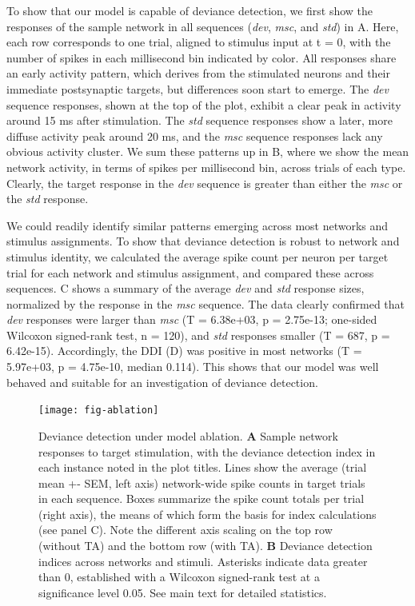 \documentclass[9pt,lineno,onehalfspacing]{elife}
\newcommand{\dev}{\textit{dev}}
\newcommand{\msc}{\textit{msc}}
\newcommand{\std}{\textit{std}}
\begin{document}
To show that our model is capable of deviance detection, we first show the responses of the sample network in all sequences (\dev{}, \msc{}, and \std{}) in A. Here, each row corresponds to one trial, aligned to stimulus input at t = 0, with the number of spikes in each millisecond bin indicated by color. All responses share an early activity pattern, which derives from the stimulated neurons and their immediate postsynaptic targets, but differences soon start to emerge. The \dev{} sequence responses, shown at the top of the plot, exhibit a clear peak in activity around 15 ms after stimulation. The \std{} sequence responses show a later, more diffuse activity peak around 20 ms, and the \msc{} sequence responses lack any obvious activity cluster. We sum these patterns up in B, where we show the mean network activity, in terms of spikes per millisecond bin, across trials of each type. Clearly, the target response in the \dev{} sequence is greater than either the \msc{} or the \std{} response.

We could readily identify similar patterns emerging across most networks and stimulus assignments. To show that deviance detection is robust to network and stimulus identity, we calculated the average spike count per neuron per target trial for each network and stimulus assignment, and compared these across sequences. C shows a summary of the average \dev{} and \std{} response sizes, normalized by the response in the \msc{} sequence. The data clearly confirmed that \dev{} responses were larger than \msc{} (T = 6.38e+03, p = 2.75e-13; one-sided Wilcoxon signed-rank test, n = 120), and \std{} responses smaller (T = 687, p = 6.42e-15). Accordingly, the DDI (D) was positive in most networks (T = 5.97e+03, p = 4.75e-10, median 0.114). This shows that our model was well behaved and suitable for an investigation of deviance detection.

\begin{figure}
    \texttt{[image: fig-ablation]}
    \caption{%
        Deviance detection under model ablation.
        \textbf{A} Sample network responses to target stimulation, with the deviance detection index in each instance noted in the plot titles. Lines show the average (trial mean +- SEM, left axis) network-wide spike counts in target trials in each sequence. Boxes summarize the spike count totals per trial (right axis), the means of which form the basis for index calculations (see panel C). Note the different axis scaling on the top row (without TA) and the bottom row (with TA).
        \textbf{B} Deviance detection indices across networks and stimuli. Asterisks indicate data greater than 0, established with a Wilcoxon signed-rank test at a significance level 0.05. See main text for detailed statistics.
    }
    \label{fig:ablation}
\end{figure}
\end{document}
